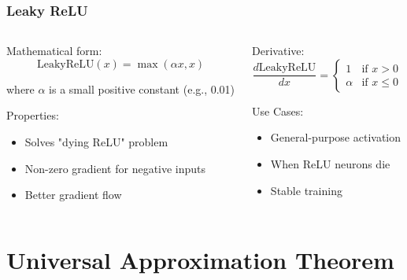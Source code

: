 \documentclass{beamer}
\begin{document}
\begin{frame}
\frametitle{Leaky ReLU}
\begin{columns}
\begin{column}{0.5\textwidth}
Mathematical form:
\begin{equation}
\text{LeakyReLU}(x) = \max(\alpha x, x)
\end{equation}

where $\alpha$ is a small positive constant (e.g., 0.01)

Properties:
\begin{itemize}
    \item Solves "dying ReLU" problem
    \item Non-zero gradient for negative inputs
    \item Better gradient flow
\end{itemize}
\end{column}
\begin{column}{0.5\textwidth}
Derivative:
\begin{equation}
\frac{d\text{LeakyReLU}}{dx} = \begin{cases} 
1 & \text{if } x > 0 \\
\alpha & \text{if } x \leq 0
\end{cases}
\end{equation}

Use Cases:
\begin{itemize}
    \item General-purpose activation
    \item When ReLU neurons die
    \item Stable training
\end{itemize}
\end{column}
\end{columns}
\end{frame}

\section{Universal Approximation Theorem}
\end{document}
